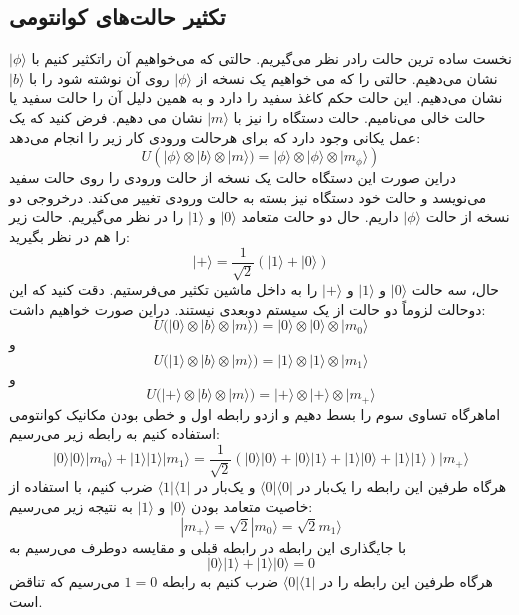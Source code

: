 \subsection{تکثیر حالت‌های کوانتومی}
نخست ساده ترین حالت رادر نظر می‌گیریم. حالتی که می‌خواهیم آن راتکثیر کنیم با $|\phi\rangle$ نشان می‌دهیم. حالتی را که می خواهیم یک نسخه از $|\phi\rangle$ روی آن نوشته شود را با $|b\rangle$ نشان می‌دهیم. این حالت حکم کاغذ سفید را دارد و به همین دلیل آن را حالت سفید یا حالت خالی می‌نامیم. حالت  دستگاه را نیز با $|m\rangle$ نشان می دهیم. فرض کنید که یک عمل یکانی وجود دارد که برای هرحالت ورودی کار زیر را انجام می‌دهد: 
\begin{equation}
	U(|\phi\rangle\otimes|b\rangle\otimes|m\rangle) = |\phi\rangle \otimes |\phi\rangle \otimes |m_{\phi}\rangle)
\end{equation}
دراین صورت این دستگاه حالت یک نسخه از حالت ورودی را روی حالت سفید می‌نویسد و حالت خود دستگاه نیز بسته به حالت ورودی تغییر می‌کند. درخروجی دو نسخه از حالت $|\phi\rangle$ داریم. حال دو حالت متعامد $|0\rangle$ و $|1\rangle$ را در نظر می‌گیریم. حالت‌ زیر را هم در نظر بگیرید:
\begin{equation}
	|+\rangle = \frac{1}{\sqrt{2}} (|1\rangle + |0\rangle)
\end{equation}
حال، سه حالت $|0\rangle$ و $|1\rangle$ و $|+\rangle$ را به داخل ماشین تکثیر می‌فرستیم. دقت کنید که این دوحالت لزوماً دو حالت از یک سیستم دوبعدی نیستند. دراین صورت خواهیم داشت: 
\begin{equation}
	U(|0\rangle\otimes|b\rangle\otimes|m\rangle) = |0\rangle \otimes |0\rangle \otimes |m_{0}\rangle
\end{equation}
و 
\begin{equation}
	U(|1\rangle\otimes|b\rangle\otimes|m\rangle) = |1\rangle \otimes |1\rangle \otimes |m_{1}\rangle
\end{equation}
و
\begin{equation}
	U(|+\rangle\otimes|b\rangle\otimes|m\rangle) = |+\rangle \otimes |+\rangle \otimes |m_{+}\rangle
\end{equation}
اماهرگاه تساوی سوم را بسط دهیم و ازدو رابطه اول و خطی بودن مکانیک کوانتومی استفاده کنیم به رابطه زیر می‌رسیم:
\begin{equation}
|0\rangle|0\rangle|m_{0}\rangle + |1\rangle|1\rangle|m_{1}\rangle = 
\frac{1}{\sqrt{2}}(|0\rangle|0\rangle + |0\rangle|1\rangle + 
					|1\rangle|0\rangle + |1\rangle|1\rangle)|m_{+}\rangle
\end{equation}
هرگاه طرفین این رابطه را یک‌بار در $\langle 0|\langle 0|$ و یک‌بار در $\langle 1|\langle 1|$ ضرب کنیم، با استفاده از خاصیت متعامد بودن $|0\rangle$ و $|1\rangle$ به نتیجه زیر می‌رسیم:
\begin{equation}
	|m_{+}\rangle = \sqrt{2}|m_{0}\rangle = \sqrt{2}m_{1}\rangle
\end{equation}  
با جایگذاری این رابطه در رابطه قبلی و مقایسه دوطرف می‌رسیم به
\begin{equation}
	|0\rangle|1\rangle + |1\rangle|0\rangle = 0
\end{equation}
هرگاه طرفین این رابطه را در $\langle 0|\langle 1|$ ضرب کنیم به رابطه $1 = 0$ می‌رسیم که تناقض است. 

